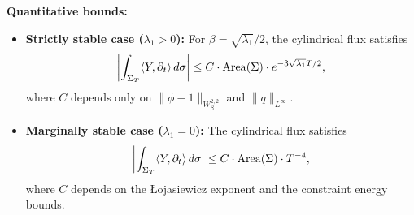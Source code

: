 \begin{proposition}
\textbf{Quantitative bounds:}
\begin{itemize}
    \item[(a)] \textbf{Strictly stable case ($\lambda_1 > 0$):} For $\beta = \sqrt{\lambda_1}/2$, the cylindrical flux satisfies
    \[
        \left| \int_{\Sigma_T} \langle Y, \partial_t \rangle \, d\sigma \right| \le C \cdot \operatorname{Area}(\Sigma) \cdot e^{-3\sqrt{\lambda_1} T / 2},
    \]
    where $C$ depends only on $\|\phi - 1\|_{W^{2,2}_\beta}$ and $\|q\|_{L^\infty}$.
    
    \item[(b)] \textbf{Marginally stable case ($\lambda_1 = 0$):} The cylindrical flux satisfies
    \[
        \left| \int_{\Sigma_T} \langle Y, \partial_t \rangle \, d\sigma \right| \le C \cdot \operatorname{Area}(\Sigma) \cdot T^{-4},
    \]
    where $C$ depends on the \L{}ojasiewicz exponent and the constraint energy bounds.
\end{itemize}
\end{proposition}

